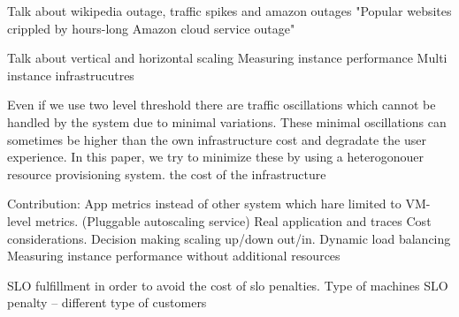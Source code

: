 
Talk about wikipedia outage, traffic spikes and amazon outages "Popular websites crippled by hours-long Amazon cloud service outage"

Talk about vertical and horizontal scaling
Measuring instance performance
Multi instance infrastrucutres

Even if we use two level threshold there are traffic oscillations which cannot be handled by the system due to minimal variations. These minimal oscillations can sometimes be higher than the own infrastructure cost and degradate the user experience. In this paper, we try to minimize these by using a heterogonouer resource provisioning system. the cost of the infrastructure

Contribution:
App metrics instead of other system which hare limited to VM-level metrics. (Pluggable autoscaling service)
Real application and traces
Cost considerations.
Decision making scaling up/down out/in.
Dynamic load balancing
Measuring instance performance without additional resources

SLO fulfillment in order to avoid the cost of slo penalties.
Type of machines
SLO penalty -- different type of customers